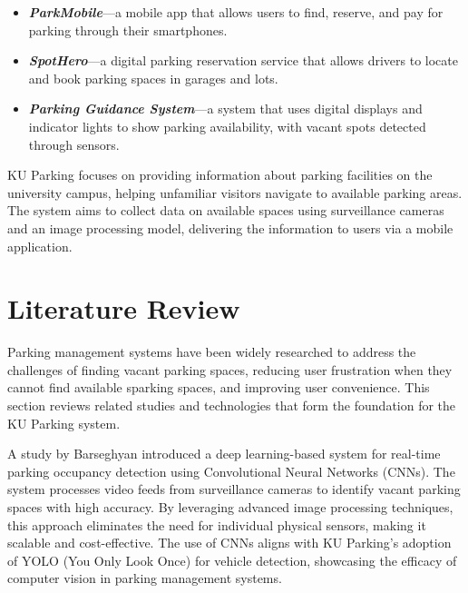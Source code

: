 \begin{itemize}
    \item \textbf{\textit{ParkMobile}}---a mobile app that allows users to find, reserve, and pay for parking through their smartphones. \cite{ParkMobile_how_it_works}
    \item \textbf{\textit{SpotHero}}---a digital parking reservation service that allows drivers to locate and book parking spaces in garages and lots. \cite{SpotHero_how_SpotHero_works}
    \item \textbf{\textit{Parking Guidance System}}---a system that uses digital displays and indicator lights to show parking availability, with vacant spots detected through sensors. \cite{Parking_Indication_Systems}
\end{itemize}
KU Parking focuses on providing information about parking facilities on the university campus, helping unfamiliar visitors navigate to available parking areas. The system aims to collect data on available spaces using surveillance cameras and an image processing model, delivering the information to users via a mobile application.

\section{Literature Review}
\label{section:literature-review}

Parking management systems have been widely researched to address the challenges of finding vacant parking spaces, 
reducing user frustration when they cannot find available sparking spaces, and improving user convenience. 
This section reviews related studies and technologies that form the foundation for the KU Parking system.

A study by Barseghyan\cite{barseghyan2023parking} introduced a deep learning-based system for real-time parking occupancy detection using Convolutional Neural Networks (CNNs). 
The system processes video feeds from surveillance cameras to identify vacant parking spaces with high accuracy. 
By leveraging advanced image processing techniques, this approach eliminates the need for individual physical sensors, making it scalable and cost-effective. 
The use of CNNs aligns with KU Parking's adoption of YOLO (You Only Look Once) for vehicle detection, showcasing the efficacy of computer vision in parking management systems.

